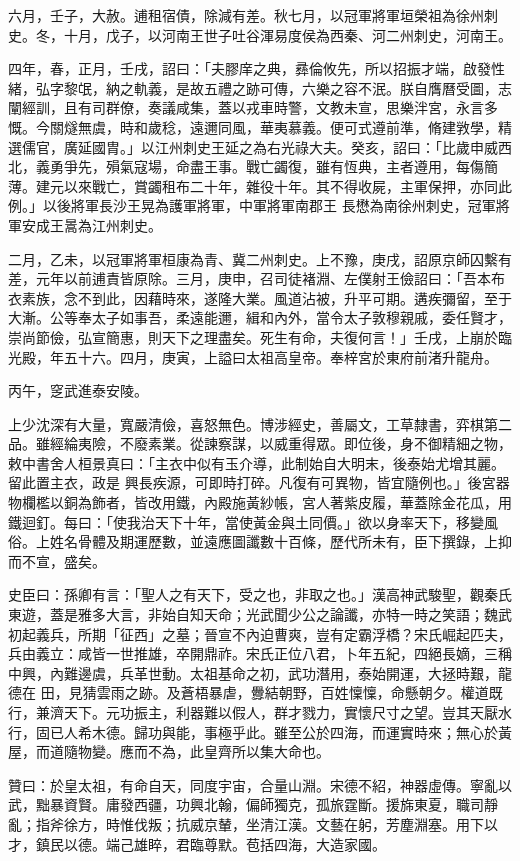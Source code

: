 \begin{pinyinscope}
 六月，壬子，大赦。逋租宿債，除減有差。秋七月，以冠軍將軍垣榮祖為徐州刺史。冬，十月，戊子，以河南王世子吐谷渾易度侯為西秦、河二州刺史，河南王。



 四年，春，正月，壬戌，詔曰：「夫膠庠之典，彞倫攸先，所以招振才端，啟發性緒，弘字黎氓，納之軌義，是故五禮之跡可傳，六樂之容不泯。朕自膺曆受圖，志闡經訓，且有司群僚，奏議咸集，蓋以戎車時警，文教未宣，思樂泮宮，永言多慨。今關燧無虞，時和歲稔，遠邇同風，華夷慕義。便可式遵前準，脩建敩學，精選儒官，廣延國胄。」以江州刺史王延之為右光祿大夫。癸亥，詔曰：「比歲申威西北，義勇爭先，殞氣寇場，命盡王事。戰亡蠲復，雖有恆典，主者遵用，每傷簡薄。建元以來戰亡，賞蠲租布二十年，雜役十年。其不得收屍，主軍保押，亦同此例。」以後將軍長沙王晃為護軍將軍，中軍將軍南郡王
 長懋為南徐州刺史，冠軍將軍安成王暠為江州刺史。



 二月，乙未，以冠軍將軍桓康為青、冀二州刺史。上不豫，庚戌，詔原京師囚繫有差，元年以前逋責皆原除。三月，庚申，召司徒褚淵、左僕射王儉詔曰：「吾本布衣素族，念不到此，因藉時來，遂隆大業。風道沾被，升平可期。遘疾彌留，至于大漸。公等奉太子如事吾，柔遠能邇，緝和內外，當令太子敦穆親戚，委任賢才，崇尚節儉，弘宣簡惠，則天下之理盡矣。死生有命，夫復何言！」壬戌，上崩於臨光殿，年五十六。四月，庚寅，上謚曰太祖高皇帝。奉梓宮於東府前渚升龍舟。



 丙午，窆武進泰安陵。



 上少沈深有大量，寬嚴清儉，喜怒無色。博涉經史，善屬文，工草隸書，弈棋第二品。雖經綸夷險，不廢素業。從諫察謀，以威重得眾。即位後，身不御精細之物，敕中書舍人桓景真曰：「主衣中似有玉介導，此制始自大明末，後泰始尤增其麗。留此置主衣，政是
 興長疾源，可即時打碎。凡復有可異物，皆宜隨例也。」後宮器物欄檻以銅為飾者，皆改用鐵，內殿施黃紗帳，宮人著紫皮履，華蓋除金花瓜，用鐵迴釘。每曰：「使我治天下十年，當使黃金與土同價。」欲以身率天下，移變風俗。上姓名骨體及期運歷數，並遠應圖讖數十百條，歷代所未有，臣下撰錄，上抑而不宣，盛矣。



 史臣曰：孫卿有言：「聖人之有天下，受之也，非取之也。」漢高神武駿聖，觀秦氏東遊，蓋是雅多大言，非始自知天命；光武聞少公之論讖，亦特一時之笑語；魏武初起義兵，所期「征西」之墓；晉宣不內迫曹爽，豈有定霸浮橋？宋氏崛起匹夫，兵由義立：咸皆一世推雄，卒開鼎祚。宋氏正位八君，卜年五紀，四絕長嫡，三稱中興，內難邊虞，兵革世動。太祖基命之初，武功潛用，泰始開運，大拯時艱，龍德在
 田，見猜雲雨之跡。及蒼梧暴虐，釁結朝野，百姓懍懍，命懸朝夕。權道既行，兼濟天下。元功振主，利器難以假人，群才戮力，實懷尺寸之望。豈其天厭水行，固已人希木德。歸功與能，事極乎此。雖至公於四海，而運實時來；無心於黃屋，而道隨物變。應而不為，此皇齊所以集大命也。



 贊曰：於皇太祖，有命自天，同度宇宙，合量山淵。宋德不紹，神器虛傳。寧亂以武，黜暴資賢。庸發西疆，功興北翰，偏師獨克，孤旅霆斷。援旆東夏，職司靜亂；指斧徐方，時惟伐叛；抗威京輦，坐清江漢。文藝在躬，芳塵淵塞。用下以才，鎮民以德。端己雄睟，君臨尊默。苞括四海，大造家國。



\end{pinyinscope}